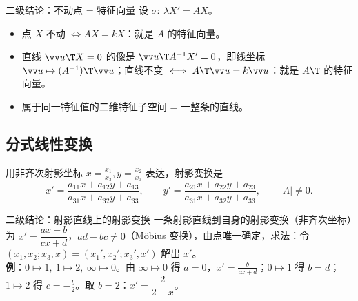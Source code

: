 \begin{thmbox}{二级结论：不动点 = 特征向量}
设 $\sigma:\ \lambda X'=AX$。
\begin{itemize}
\item 点 $X$ 不动 $\iff AX=kX$：就是 $A$ 的特征向量。
\item 直线 $\vv u\T X=0$ 的像是 $\vv u\T A^{-1}X'=0$，即线坐标 $\vv u\mapsto (A^{-1})\T\vv u$；直线不变 $\iff A\T\vv u=k\vv u$：就是 $A\T$ 的特征向量。
\item 属于同一特征值的二维特征子空间 = 一整条的直线。
\end{itemize}
\end{thmbox}

\subsection{分式线性变换}
用非齐次射影坐标 $x=\frac{x_1}{x_3},y=\frac{x_2}{x_3}$ 表达，射影变换是
\begin{equation}
x'=\frac{a_{11}x+a_{12}y+a_{13}}{a_{31}x+a_{32}y+a_{33}},\qquad y'=\frac{a_{21}x+a_{22}y+a_{23}}{a_{31}x+a_{32}y+a_{33}},\qquad |A|\neq0 .
\end{equation}

\begin{thmbox}{二级结论：射影直线上的射影变换}
一条射影直线到自身的射影变换（非齐次坐标）为 $x'=\dfrac{ax+b}{cx+d}$，$ad-bc\neq0$（Möbius 变换），由点唯一确定，求法：令 $(x_1,x_2;x_3,x)=(x_1',x_2';x_3',x')$ 解出 $x'$。\\
\textbf{例}：$0\mapsto1,\ 1\mapsto2,\ \infty\mapsto0$。由 $\infty\mapsto0$ 得 $a=0$，$x'=\frac{b}{cx+d}$；$0\mapsto1$ 得 $b=d$；$1\mapsto2$ 得 $c=-\frac b2$。取 $b=2$：$x'=\dfrac{2}{2-x}$。
\end{thmbox}

